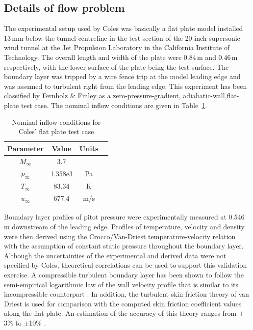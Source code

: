 \subsection{Details of flow problem}
\label{flat-plate-flow-problem}
%
The experimental setup used by Coles was basically a flat plate model
installed 13\,mm below the tunnel centreline in the test section of
the 20-inch supersonic wind tunnel at the Jet Propulsion Laboratory in the California Institute of Technology.
The overall length and width of the plate were 0.84\,m and 0.46\,m
respectively, with the lower surface of the plate being the test surface. 
The boundary layer was tripped by a wire fence trip at the model leading 
edge and was assumed to turbulent right from the leading edge.
This experiment has been classified by Fernholz \& Finley \cite{Fernholz1977} as a
zero-pressure-gradient, adiabatic-wall,flat-plate test case.
The nominal inflow conditions are given in Table~\ref{inflow-conditions-table1}.
%
\begin{table}[h]
  \caption{Nominal inflow conditions for Coles' flat plate test case}
  \label{inflow-conditions-table1}
  \begin{center}
    \begin{tabular}{cccl}
      \hline\hline
      Parameter & Value   & Units \\
      \hline
      $M_\infty$  & 3.7     &     \\
      $p_\infty$  & 1.358e3 & Pa  \\
      $T_\infty$  & 83.34   & K   \\
      $u_\infty$  & 677.4   & m/s \\
      \hline \hline
    \end{tabular}
  \end{center}
\end{table}
%
Boundary layer profiles of pitot pressure were
experimentally measured at 0.546\,m downstream of the leading edge.
Profiles of temperature, velocity and density were then derived using
the Crocco/Van-Driest temperature-velocity relation with the
assumption of constant static pressure throughout the boundary layer.
Although the uncertainties of the experimental and derived data were not
specified by Coles, theoretical correlations can be used to support this 
validation exercise. A compressible turbulent boundary layer has been 
shown to follow the semi-empirical logarithmic law of the wall
velocity profile that is similar to its incompressible counterpart \cite{Smits2006}.
In addition, the turbulent skin friction theory of van Driest \cite{vanDriest1956} is used for comparison
with the computed skin friction coefficient values along the flat plate.
An estimation of the accuracy of this theory ranges from $\pm$3\% \cite{Squire2000}
to $\pm$10\% \cite{Hopkins1971}.
